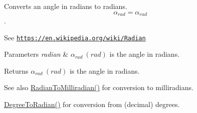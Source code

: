 Converts an angle in radians to radians. \[\alpha_{rad}=\alpha_{rad}\]. 

See \href{https://en.wikipedia.org/wiki/Radian}{\tt https\+://en.\+wikipedia.\+org/wiki/\+Radian} 
\begin{DoxyParams}{Parameters}
{\em radian} & $\alpha_{rad}\ (rad)$ is the angle in radians. \\
\hline
\end{DoxyParams}
\begin{DoxyReturn}{Returns}
$\alpha_{rad}\ (rad)$ is the angle in radians. 
\end{DoxyReturn}
\begin{DoxySeeAlso}{See also}
\mbox{\hyperlink{group___e_g_x_math-_angle_conversions-_radian_gaea391f0cca39b05e298dd1cae162e7f1}{Radian\+To\+Milliradian()}} for conversion to milliradians. 

\mbox{\hyperlink{group___e_g_x_math-_angle_conversions-_degree_ga48585541b228c852c9d08a9eac3682f0}{Degree\+To\+Radian()}} for conversion from (decimal) degrees. 
\end{DoxySeeAlso}
